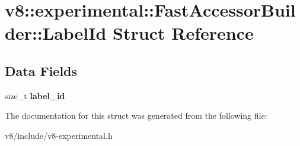 \hypertarget{structv8_1_1experimental_1_1FastAccessorBuilder_1_1LabelId}{}\section{v8\+:\+:experimental\+:\+:Fast\+Accessor\+Builder\+:\+:Label\+Id Struct Reference}
\label{structv8_1_1experimental_1_1FastAccessorBuilder_1_1LabelId}
\subsection*{Data Fields}
\begin{DoxyCompactItemize}
\item 
size\+\_\+t {\bfseries label\+\_\+id}\hypertarget{structv8_1_1experimental_1_1FastAccessorBuilder_1_1LabelId_abdf1bdba753c7de77ad908dc75c8c58b}{}\label{structv8_1_1experimental_1_1FastAccessorBuilder_1_1LabelId_abdf1bdba753c7de77ad908dc75c8c58b}

\end{DoxyCompactItemize}


The documentation for this struct was generated from the following file\+:\begin{DoxyCompactItemize}
\item 
v8/include/v8-\/experimental.\+h\end{DoxyCompactItemize}
